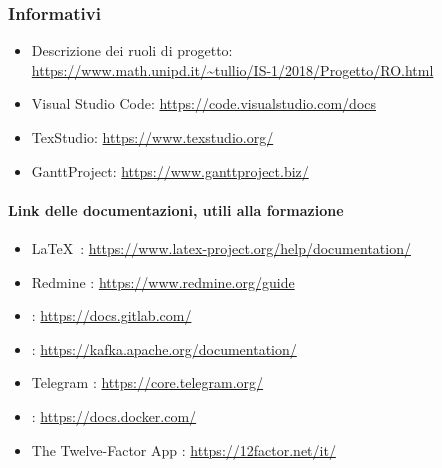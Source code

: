     \subsubsection{Informativi}	\label{rifinfo}
    \begin{itemize}
        \item Descrizione dei ruoli di progetto: \\\url{https://www.math.unipd.it/~tullio/IS-1/2018/Progetto/RO.html}
        \item Visual Studio Code: \url{https://code.visualstudio.com/docs}
        \item TexStudio: \url{https://www.texstudio.org/}
        \item GanttProject: \url{https://www.ganttproject.biz/}
	\end{itemize}

	\paragraph*{Link delle documentazioni, utili alla formazione}
	\begin{itemize}
		\item \LaTeX\ : \url{https://www.latex-project.org/help/documentation/}
		\item Redmine : \url{https://www.redmine.org/guide}
		\item {} : \url{https://docs.gitlab.com/}
		\item {} : \url{https://kafka.apache.org/documentation/}
		\item Telegram : \url{https://core.telegram.org/}
		\item {} : \url{https://docs.docker.com/}
		\item The Twelve-Factor App : \url{https://12factor.net/it/}
	\end{itemize}
